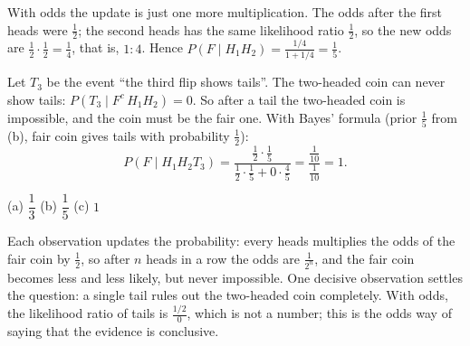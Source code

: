 \begin{solution}
	 With odds the update is just one more multiplication. The
	odds after the first heads were $\frac12$; the second heads has the same
	likelihood ratio $\frac12$, so the new odds are
	$\frac12\cdot\frac12=\frac14$, that is, $1:4$. Hence
	$P(F\mid H_1H_2)=\frac{1/4}{1+1/4}=\frac15$.

	 Let $T_3$ be the event ``the third flip shows tails''. The
	two-headed coin can never show tails: $P(T_3\mid F^c\,H_1H_2)=0$. So after
	a tail the two-headed coin is impossible, and the coin must be the fair
	one. With Bayes' formula (prior $\frac15$ from (b), fair coin gives tails
	with probability $\frac12$):
	\[
		P(F\mid H_1H_2T_3)
		=\frac{\frac12\cdot\frac15}{\frac12\cdot\frac15+0\cdot\frac45}
		=\frac{\frac1{10}}{\frac1{10}}
		=1.
	\]

	\begin{answer}
		(a) $\dfrac13$ \quad (b) $\dfrac15$ \quad (c) $1$
	\end{answer}

	\begin{remark}
		Each observation updates the probability: every heads multiplies the
		odds of the fair coin by $\frac12$, so after $n$ heads in a row the odds
		are $\frac1{2^n}$, and the fair coin becomes less and less likely, but
		never impossible. One decisive observation settles the question: a
		single tail rules out the two-headed coin completely. With odds, the
		likelihood ratio of tails is $\frac{1/2}{0}$, which is not a number;
		this is the odds way of saying that the evidence is conclusive.
	\end{remark}
\end{solution}
